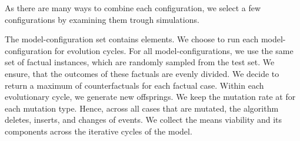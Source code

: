 \documentclass[./../../paper.tex]{subfiles}
\begin{document}
\label{sec:exp1}
As there are many ways to combine each configuration, we select a few configurations by examining them trough simulations.  



The model-configuration set contains  elements. We choose to run each model-configuration for  evolution cycles. For all model-configurations, we use the same set of  factual \glspl{instance}, which are randomly sampled from the test set. We ensure, that the outcomes of these factuals are evenly divided. We decide to return a maximum of  counterfactuals for each factual case. Within each evolutionary cycle, we generate  new offsprings. We keep the mutation rate at  for each mutation type. Hence, across all cases that are mutated, the algorithm deletes, inserts, and changes  of events. We collect the means viability and its components across the iterative cycles of the model.


\end{document}
